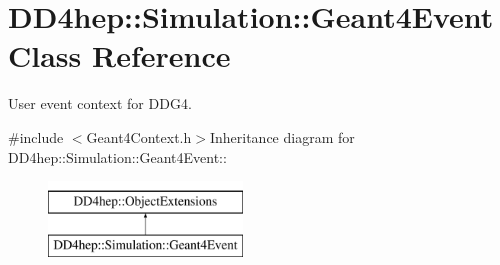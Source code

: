 \hypertarget{class_d_d4hep_1_1_simulation_1_1_geant4_event}{
\section{DD4hep::Simulation::Geant4Event Class Reference}
\label{class_d_d4hep_1_1_simulation_1_1_geant4_event}
}


User event context for DDG4.  


{\ttfamily \#include $<$Geant4Context.h$>$}Inheritance diagram for DD4hep::Simulation::Geant4Event::\begin{figure}[H]
\begin{center}
\leavevmode
\includegraphics[height=2cm]{class_d_d4hep_1_1_simulation_1_1_geant4_event}
\end{center}
\end{figure}
